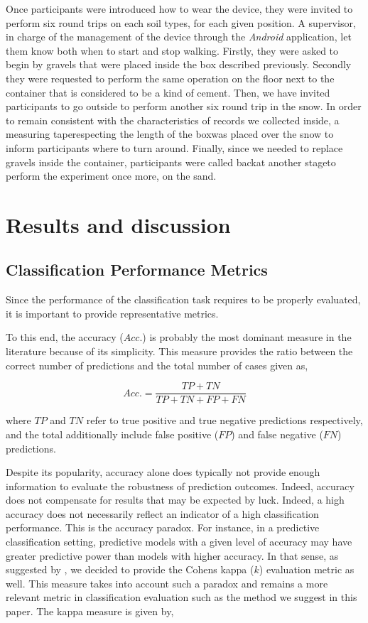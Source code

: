 \documentclass[conference]{IEEEtran}
\begin{document}
Once participants were introduced how to wear the device, they were invited to perform six round trips on each soil types, for each given position. A supervisor, in charge of the management of the device through the \textit{Android} application, let them know both when to start and stop walking. Firstly, they were asked to begin by gravels that were placed inside the box described previously. Secondly they were requested to perform the same operation on the floor next to the container that is considered to be a kind of cement. Then, we have invited participants to go outside to perform another six round trip in the snow. In order to remain consistent with the characteristics of records we collected inside, a measuring tape\textemdash respecting the length of the box\textemdash was placed over the snow to inform participants where to turn around. Finally, since we needed to replace gravels inside the container, participants were called back\textemdash at another stage\textemdash to perform the experiment once more, on the sand.

\section{Results and discussion}

\subsection{Classification Performance Metrics}

Since the performance of the classification task requires to be properly evaluated, it is important to provide representative metrics. 

To this end, the accuracy ($Acc.$) is probably the most dominant measure in the literature because of its simplicity. This measure provides the ratio between the correct number of predictions and the total number of cases given as,

\begin{equation}
	\label{eq:f_acc}
	Acc. = \frac{TP + TN}{TP + TN + FP + FN}
\end{equation}

\noindent where $TP$ and $TN$ refer to true positive and true negative predictions respectively, and the total additionally include false positive ($FP$) and false negative ($FN$) predictions.

Despite its popularity, accuracy alone does typically not provide enough information to evaluate the robustness of prediction outcomes. Indeed, accuracy does not compensate for results that may be expected by luck. Indeed, a high accuracy does not necessarily reflect an indicator of a high classification performance. This is the accuracy paradox. For instance, in a predictive classification setting, predictive models with a given level of accuracy may have greater predictive power than models with higher accuracy. In that sense, as suggested by \citet{Ben-David2007}, we decided to provide the Cohen\textquotesingle s kappa ($k$) evaluation metric as well. This measure takes into account such a paradox and remains a more relevant metric in classification evaluation such as the method we suggest in this paper. The kappa measure is given by,
\end{document}
